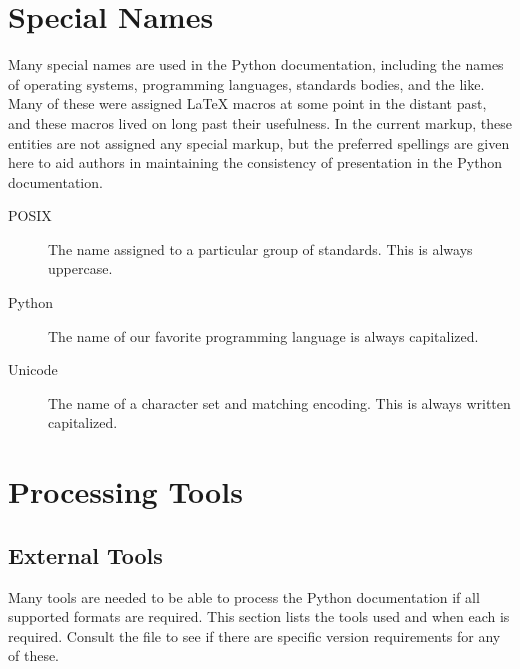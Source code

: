 \documentclass{howto}
\begin{document}
\section{Special Names}

  Many special names are used in the Python documentation, including
  the names of operating systems, programming languages, standards
  bodies, and the like.  Many of these were assigned \LaTeX{} macros
  at some point in the distant past, and these macros lived on long
  past their usefulness.  In the current markup, these entities are
  not assigned any special markup, but the preferred spellings are
  given here to aid authors in maintaining the consistency of
  presentation in the Python documentation.

  \begin{description}
    \item[POSIX]
	The name assigned to a particular group of standards.  This is
	always uppercase.

    \item[Python]
	The name of our favorite programming language is always
	capitalized.

    \item[Unicode]
	The name of a character set and matching encoding.  This is
        always written capitalized.
  \end{description}


\section{Processing Tools}

  \subsection{External Tools}

    Many tools are needed to be able to process the Python
    documentation if all supported formats are required.  This
    section lists the tools used and when each is required.  Consult
    the  file to see if there are specific version
    requirements for any of these.
\end{document}
